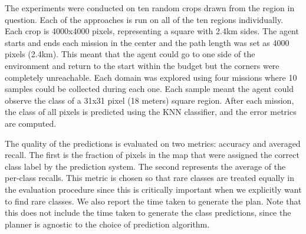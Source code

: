 The experiments were conducted on ten random crops drawn from the region in question. Each of the approaches is run on all of the ten regions individually. Each crop is 4000x4000 pixels, representing a square with 2.4km sides. The agent starts and ends each mission in the center and the path length was set as 4000 pixels (2.4km). This meant that the agent could go to one side of the environment and return to the start within the budget but the corners were completely unreachable. Each domain was explored using four missions where 10 samples could be collected during each one. Each sample meant the agent could observe the class of a 31x31 pixel (18 meters) square region. After each mission, the class of all pixels is predicted using the KNN classifier, and the error metrics are computed.

The quality of the predictions is evaluated on two metrics: accuracy and averaged recall. The first is the fraction of pixels in the map that were assigned the correct class label by the prediction system. The second represents the average of the per-class recalls. This metric is chosen so that rare classes are treated equally in the evaluation procedure since this is critically important when we explicitly want to find rare classes. We also report the time taken to generate the plan. Note that this does not include the time taken to generate the class predictions, since the planner is agnostic to the choice of prediction algorithm.


